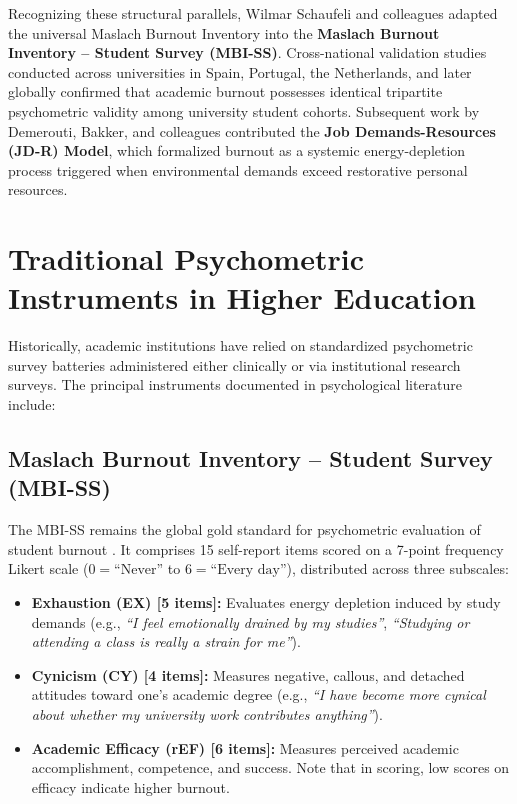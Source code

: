 \documentclass[12pt,a4paper,oneside]{report}
\begin{document}
Recognizing these structural parallels, Wilmar Schaufeli and colleagues \cite{schaufeli2002} adapted the universal Maslach Burnout Inventory into the \textbf{Maslach Burnout Inventory -- Student Survey (MBI-SS)}. Cross-national validation studies conducted across universities in Spain, Portugal, the Netherlands, and later globally confirmed that academic burnout possesses identical tripartite psychometric validity among university student cohorts. Subsequent work by Demerouti, Bakker, and colleagues \cite{demerouti2001, bakker2014} contributed the \textbf{Job Demands-Resources (JD-R) Model}, which formalized burnout as a systemic energy-depletion process triggered when environmental demands exceed restorative personal resources.

\section{Traditional Psychometric Instruments in Higher Education}
\label{sec:psychometric_instruments}
Historically, academic institutions have relied on standardized psychometric survey batteries administered either clinically or via institutional research surveys. The principal instruments documented in psychological literature include:

\subsection{Maslach Burnout Inventory -- Student Survey (MBI-SS)}
The MBI-SS remains the global gold standard for psychometric evaluation of student burnout \cite{schaufeli2002}. It comprises 15 self-report items scored on a 7-point frequency Likert scale ($0 = \text{``Never''}$ to $6 = \text{``Every day''}$), distributed across three subscales:
\begin{itemize}
    \item \textbf{Exhaustion (EX) [5 items]:} Evaluates energy depletion induced by study demands (e.g., \emph{``I feel emotionally drained by my studies''}, \emph{``Studying or attending a class is really a strain for me''}).
    \item \textbf{Cynicism (CY) [4 items]:} Measures negative, callous, and detached attitudes toward one's academic degree (e.g., \emph{``I have become more cynical about whether my university work contributes anything''}).
    \item \textbf{Academic Efficacy (rEF) [6 items]:} Measures perceived academic accomplishment, competence, and success. Note that in scoring, low scores on efficacy indicate higher burnout.
\end{itemize}
\end{document}
